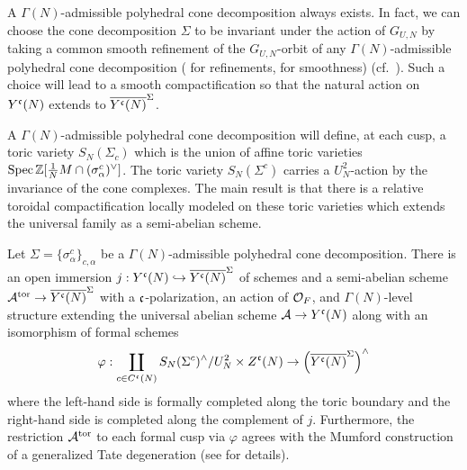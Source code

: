 \documentclass[main.tex]{subfiles}
\begin{document}
{A $\Gamma(N)$-admissible polyhedral cone decomposition always exists. In fact, we can choose the cone decomposition $\Sigma$ to be invariant under the action of $G_{U,N}$ by taking a common smooth refinement of the $G_{U,N}$-orbit of any $\Gamma(N)$-admissible polyhedral cone decomposition (\cite[Lemme 4.2(i)]{rapoport:compactifications} for refinements, \cite[Corollaire~7.5]{dimitrov:compactification_hilbert} for smoothness) (cf.\ \cite[p.9]{yang:geometric_serre}). Such a choice will lead to a smooth compactification so that the natural action on $Y^{\mathfrak{c}}(N)$ extends to $\overline{Y^{\mathfrak{c}}(N)}^{\Sigma}$.
\par 
A $\Gamma(N)$-admissible polyhedral cone decomposition will define, at each cusp, a toric variety $S_N(\Sigma_c)$ which is the union of affine toric varieties $\operatorname{\mathrm{Spec}}{\mathbb{Z}[\frac{1}{N} M \cap (\sigma_{\alpha}^c)^{\vee}]}$. The toric variety $S_N(\Sigma^c)$ carries a $U_N^2$-action by the invariance of the cone complexes. The main result is that there is a relative toroidal compactification locally modeled on these toric varieties which extends the universal family as a semi-abelian scheme.

\begin{theorem}
Let $\Sigma = \{ \sigma^c_{\alpha} \}_{c, \alpha}$ be a $\Gamma(N)$-admissible polyhedral cone decomposition. There is an open immersion $j : Y^{\mathfrak{c}}(N) \hookrightarrow \overline{Y^{\mathfrak{c}}(N)}^{\Sigma}$ of schemes and a semi-abelian scheme $\mathcal{A}^{\mathrm{tor}} \to \overline{Y^{\mathfrak{c}}(N)}^{\Sigma}$ with a $\mathfrak{c}$-polarization, an action of $\mathcal{O}_F$, and $\Gamma(N)$-level structure extending the universal abelian scheme $\mathcal{A} \to Y^{\mathfrak{c}}(N)$ along with an isomorphism of formal schemes
\[ \varphi : \coprod_{c \in C^{\mathfrak{c}}(N)} S_N(\Sigma^c)^{\wedge} / U_N^2 \times Z^{\mathfrak{c}}(N) \to \left( \overline{Y^{\mathfrak{c}}(N)}^{\Sigma} \right)^{\wedge} \]
where the left-hand side is formally completed along the toric boundary and the right-hand side is completed along the complement of $j$. Furthermore, the restriction $\mathcal{A}^{\mathrm{tor}}$ to each formal cusp via $\varphi$ agrees with the Mumford construction \cite{mumford:analytic_degeneration} of a generalized Tate degeneration (see \cite[\S3]{chai:arithmetic_compactifications} for details).
\end{theorem}

}
\end{document}
